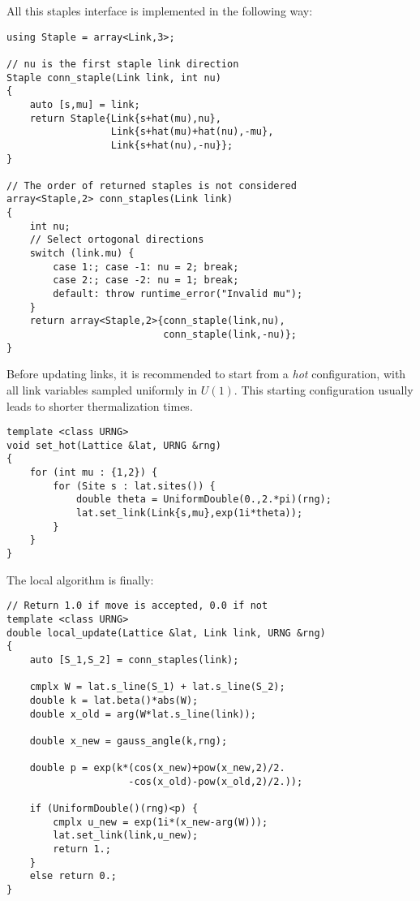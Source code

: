 All this staples interface is implemented in the following way:
\begin{lstlisting}[caption={Staple type}]
using Staple = array<Link,3>;

// nu is the first staple link direction
Staple conn_staple(Link link, int nu)
{
    auto [s,mu] = link;
    return Staple{Link{s+hat(mu),nu},
                  Link{s+hat(mu)+hat(nu),-mu},
                  Link{s+hat(nu),-nu}};
}

// The order of returned staples is not considered
array<Staple,2> conn_staples(Link link)
{
    int nu;
    // Select ortogonal directions
    switch (link.mu) {
        case 1:; case -1: nu = 2; break;
        case 2:; case -2: nu = 1; break;
        default: throw runtime_error("Invalid mu");
    }
    return array<Staple,2>{conn_staple(link,nu),
                           conn_staple(link,-nu)};
}
\end{lstlisting}

Before updating links, it is recommended to start from a \emph{hot} configuration,
\ie with all link variables sampled uniformly in $U(1)$.
This starting configuration usually leads to shorter thermalization times.
\begin{lstlisting}[caption={Hot configuration}]
template <class URNG>
void set_hot(Lattice &lat, URNG &rng)
{
    for (int mu : {1,2}) {
        for (Site s : lat.sites()) {
            double theta = UniformDouble(0.,2.*pi)(rng);
            lat.set_link(Link{s,mu},exp(1i*theta));
        }
    }
}
\end{lstlisting}

The local algorithm is finally:
\begin{lstlisting}[caption={Local algorithm}]
// Return 1.0 if move is accepted, 0.0 if not
template <class URNG>
double local_update(Lattice &lat, Link link, URNG &rng)
{
    auto [S_1,S_2] = conn_staples(link);
    
    cmplx W = lat.s_line(S_1) + lat.s_line(S_2);
    double k = lat.beta()*abs(W);
    double x_old = arg(W*lat.s_line(link));
    
    double x_new = gauss_angle(k,rng);
    
    double p = exp(k*(cos(x_new)+pow(x_new,2)/2.
                     -cos(x_old)-pow(x_old,2)/2.));
    
    if (UniformDouble()(rng)<p) {
        cmplx u_new = exp(1i*(x_new-arg(W)));
        lat.set_link(link,u_new);
        return 1.;
    }
    else return 0.;
}
\end{lstlisting}


